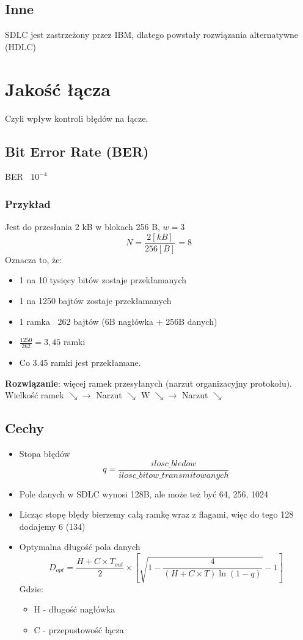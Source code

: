 \documentclass[a4paper,twoside]{article}
\begin{document}
	\subsection{Inne}
		SDLC jest zastrzeżony przez IBM, dlatego powstały rozwiązania alternatywne (HDLC)
	
\section{Jakość łącza}
Czyli wpływ kontroli błędów na łącze.\\
\subsection{Bit Error Rate (BER)}
BER $ ~ $ $ 10^{-4} $ \\
\subsubsection{Przykład}
Jest do przesłania 2 kB w blokach 256 B, $ w = 3 $\\
\begin{equation}
 N = \frac{2[kB]}{256[B]}=8 
\end{equation}
Oznacza to, że:
\begin{itemize}
	\item 1 na 10 tysięcy bitów zostaje przekłamanych
	\item 1 na 1250 bajtów zostaje przekłamanych
	\item 1 ramka $ ~ $ 262 bajtów (6B nagłówka + 256B danych)
	\item $ \frac{1250}{262}=3,45 $ ramki
	\item Co 3.45 ramki jest przekłamane.
\end{itemize}
\textbf{Rozwiązanie}: więcej ramek przesyłanych (narzut organizacyjny protokołu).\\
Wielkość ramek $ \searrow \rightarrow $ Narzut $ \searrow $ W $ \searrow \rightarrow $ Narzut $ \searrow $
\subsection{Cechy}
\begin{itemize}
	\item Stopa błędów 
	\begin{equation}
	q=\frac{ilosc\_bledow}{ilosc\_bitow\_transmitowanych} 
	\end{equation}
	\item Pole danych w SDLC wynosi 128B, ale może też być 64, 256, 1024
	\item Licząc stopę błędy bierzemy całą ramkę wraz z flagami, więc do tego 128 dodajemy 6 (134)
	\item Optymalna długość pola danych
	\begin{equation}
	D_{opt}=\frac{H+C\times{T_{out}}}{2}\times  [\sqrt{1-\frac{4}{(H+C\times{T})\ln{(1-q)}}}-1]
	\end{equation} 
	Gdzie:
		\begin{itemize}
			\item H - długość nagłówka
			\item C - przepustowość łącza
		\end{itemize}
\end{itemize}
\end{document}
